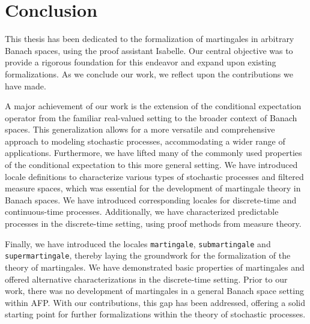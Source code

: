 
\chapter{Conclusion}\label{chapter:conclusion}

This thesis has been dedicated to the formalization of martingales in arbitrary Banach spaces, using the proof assistant Isabelle. Our central objective was to provide a rigorous foundation for this endeavor and expand upon existing formalizations. As we conclude our work, we reflect upon the contributions we have made.

A major achievement of our work is the extension of the conditional expectation operator from the familiar real-valued setting to the broader context of Banach spaces. This generalization allows for a more versatile and comprehensive approach to modeling stochastic processes, accommodating a wider range of applications. Furthermore, we have lifted many of the commonly used properties of the conditional expectation to this more general setting. We have introduced locale definitions to characterize various types of stochastic processes and filtered measure spaces, which was essential for the development of martingale theory in Banach spaces. We have introduced corresponding locales for discrete-time and continuous-time processes. Additionally, we have characterized predictable processes in the discrete-time setting, using proof methods from measure theory.

Finally, we have introduced the locales \texttt{martingale}, \texttt{submartingale} and \texttt{supermartin\-gale}, thereby laying the groundwork for the formalization of the theory of martingales. We have demonstrated basic properties of martingales and offered alternative characterizations in the discrete-time setting. Prior to our work, there was no development of martingales in a general Banach space setting within \textsf{AFP}. With our contributions, this gap has been addressed, offering a solid starting point for further formalizations within the theory of stochastic processes.